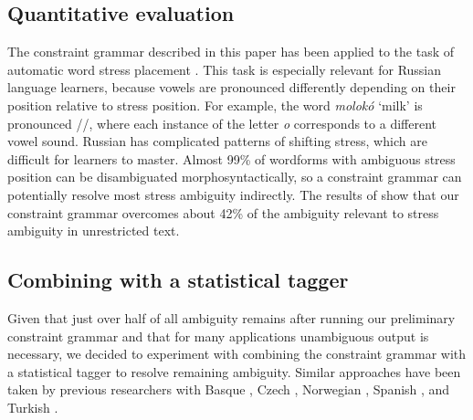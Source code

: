 \documentclass[11pt]{article}
\begin{document}



\subsection{Quantitative evaluation}

The constraint grammar described in this paper has been applied to the task of automatic
word stress placement \cite{reynolds.tyers-15}. This task is especially relevant for 
Russian language learners, because vowels are pronounced differently depending on their position 
relative to stress position. For example, the word \emph{molokó} `milk' is pronounced 
//, where each instance of the letter \emph{o} corresponds to a different vowel sound. 
Russian has complicated patterns of shifting stress, which are difficult for learners to master.
Almost 99\% of wordforms with ambiguous stress position can be disambiguated morphosyntactically,
so a constraint grammar can potentially resolve most stress ambiguity indirectly. The results of 
 show that our constraint grammar overcomes about 42\% of the ambiguity 
relevant to stress ambiguity in unrestricted text.

\subsection{Combining with a statistical tagger}

Given that just over half of all ambiguity remains after running our preliminary constraint
grammar and that for many applications unambiguous output is necessary, we decided to 
experiment with combining the constraint grammar with a statistical tagger to resolve remaining
ambiguity. Similar approaches have been taken by previous researchers with Basque \cite{ezeiza.ea-98}, 
Czech \cite{hajic.ea-01,hajic.ea-07}, Norwegian \cite{johannessen.ea-11,johannessen.ea-12}, 
Spanish \cite{hulden12}, and Turkish \cite{oflazer.tur-96}. 
\end{document}
